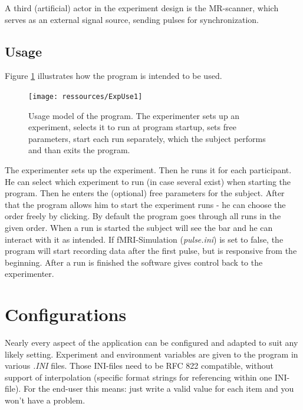 \documentclass[12pt,a4paper]{book}
\begin{document}
A third (artificial) actor in the experiment design is the MR-scanner, which serves as an external signal source, sending pulses for synchronization.

\section{Usage}

Figure \ref{fig:use} illustrates how the program is intended to be used.

\begin{figure}
	\texttt{[image: ressources/ExpUse1]}
	\caption{Usage model of the program. The experimenter sets up an experiment, selects it to run at program startup, sets free parameters, start each run separately, which the subject performs and than exits the program.}
	\label{fig:use}
\end{figure}

The experimenter sets up the experiment. Then he runs it for each participant. He can select which experiment to run (in case several exist) when starting the program. Then he enters the (optional) free parameters for the subject. After that the program allows him to start the experiment runs - he can choose the order freely by clicking. By default the program goes through all runs in the given order. When a run is started the subject will see the bar and he can interact with it as intended. If fMRI-Simulation (\textit{pulse.ini}) is set to false, the program will start recording data after the first pulse, but is responsive from the beginning. After a run is finished the software gives control back to the experimenter.

\chapter{Configurations}

Nearly every aspect of the application can be configured and adapted to suit any likely setting. Experiment and environment variables are given to the program in various \textit{.INI} files. Those INI-files need to be RFC 822 compatible, without support of interpolation (specific format strings for referencing within one INI-file). For the end-user this means: just write a valid value for each item and you won't have a problem.
\end{document}
